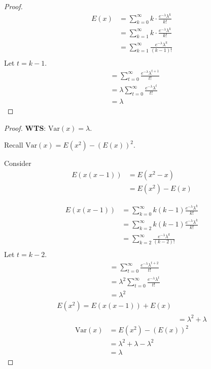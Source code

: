 \documentclass[letterpaper,12pt]{article}
\begin{document}
\begin{proof}
    \begin{align*}
        E(x) &= \sum^{\infty}_{k=0} k\cdot \frac{e^{-\lambda} \lambda^k}{k!}\\
             &= \sum^{\infty}_{k=1}k\cdot \frac{e^{-\lambda}\lambda^k}{k!}\\
             &= \sum^{\infty}_{k=1}\frac{e^{-\lambda}\lambda^k}{(k-1)!}\\
    \end{align*}
    Let $t = k-1$. 
\begin{align*}
             &= \sum^{\infty}_{t=0} \frac{e^{-\lambda}\lambda^{t+1}}{t!}\\
             &=\lambda \sum^{\infty}_{t=0} \frac{e^{-\lambda}\lambda^{t}}{t!}\\
             &= \lambda
\end{align*}
\end{proof}
\begin{proof}

    \textbf{WTS}: $ \mathrm{Var}(x) = \lambda$.


   Recall $ \mathrm{Var}(x) = E(x^2) - (E(x))^2$.
   

   Consider
   \begin{align*}
       E(x(x-1)) &= E(x^2 - x)\\
                 &= E(x^2) - E(x)
   \end{align*}

   \begin{align*}
       E(x(x-1)) &= \sum^{\infty}_{k=0} k(k-1) \frac{e^{-\lambda}\lambda^k}{k!}\\
                 &= \sum^{\infty}_{k=2} k(k-1) \frac{e^{-\lambda}\lambda^k}{k!}\\
                 &= \sum^{\infty}_{k=2} \frac{e^{-\lambda}\lambda^k}{(k-2)!}\\
   \end{align*}
   Let $t = k-2$.
   \begin{align*}
                 &= \sum^{\infty}_{t=0} \frac{e^{-\lambda}\lambda^{t+2}}{t!}\\
                 &=\lambda^2  \sum^{\infty}_{t=0} \frac{e^{-\lambda}\lambda^{t}}{t!}\\
                 &=\lambda^2  
   \end{align*}
   \begin{align*}
       E(x^2) = E(x(x-1)) + E(x)\\
       &= \lambda^2 + \lambda
   \end{align*}
   \begin{align*}
       \mathrm{Var}(x) &= E(x^2) - (E(x))^2\\
                       &= \lambda^2 + \lambda - \lambda^2 \\
                       &= \lambda
   \end{align*}
\end{proof}
\end{document}
